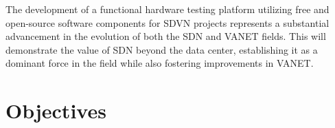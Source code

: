 The development of a functional hardware testing platform utilizing free and open-source software components for SDVN projects represents a substantial advancement in the evolution of both the SDN and VANET fields. This will demonstrate the value of SDN beyond the data center, establishing it as a dominant force in the field while also fostering improvements in VANET.


\section{Objectives} %
\label{sec:objectives}











